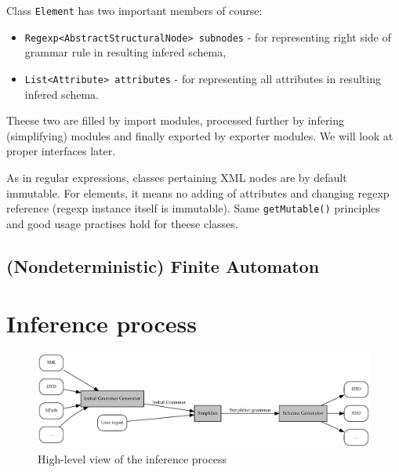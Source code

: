 \documentclass[a4paper,10pt,oneside]{article}
\newcommand{\myscale}{0.74}
\newcommand{\code}[1]{\texttt{#1}}
\begin{document}
Class \code{Element} has two important members of course:
\begin{itemize}
	\item \code{Regexp<AbstractStructuralNode> subnodes} - for representing right side of grammar rule in resulting infered schema,
	\item \code{List<Attribute> attributes} - for representing all attributes in resulting infered schema.
\end{itemize}
Theese two are filled by import modules, processed further by infering (simplifying) modules and finally exported by exporter modules. We will look at proper interfaces later.

As in regular expressions, classes pertaining XML nodes are by default immutable.
For elements, it means no adding of attributes and changing regexp reference (regexp instance itself is immutable).
Same \code{getMutable()} principles and good usage practises hold for theese classes.

\subsection{(Nondeterministic) Finite Automaton}


\section{Inference process}
\begin{figure}
	\caption{High-level view of the inference process} \label{inference_process}
	\centering\includegraphics[scale=\myscale]{inference_process}
\end{figure}

\end{document}
